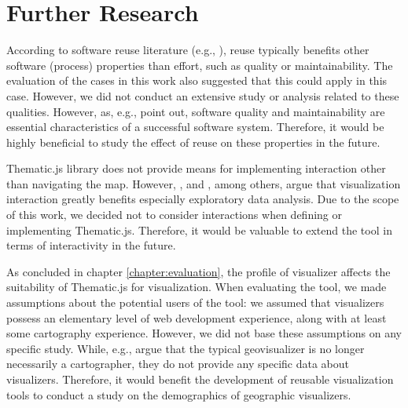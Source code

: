 \section{Further Research}

According to software reuse literature (e.g., \citealt{mohagheghi_quality_2007,frakes_success_1994}), reuse typically benefits other software (process) properties than effort, such as quality or maintainability. The evaluation of the cases in this work also suggested that this could apply in this case. However, we did not conduct an extensive study or analysis related to these qualities. However, as, e.g., \citet{kitchenham_software_1996} point out, software quality and maintainability are essential characteristics of a successful software system. Therefore, it would be highly beneficial to study the effect of reuse on these properties in the future.

Thematic.js library does not provide means for implementing interaction other than navigating the map. However, \citet{andrienko_interactive_1999}, and \citet[chap.~21]{slocum_thematic_2014}, among others, argue that visualization interaction greatly benefits especially exploratory data analysis. Due to the scope of this work, we decided not to consider interactions when defining or implementing Thematic.js. Therefore, it would be valuable to extend the tool in terms of interactivity in the future.

As concluded in chapter \ref{chapter:evaluation}, the profile of visualizer affects the suitability of Thematic.js for visualization. When evaluating the tool, we made assumptions about the potential users of the tool: we assumed that visualizers possess an elementary level of web development experience, along with at least some cartography experience. However, we did not base these assumptions on any specific study. While, e.g., \citet{slocum_thematic_2014} argue that the typical geovisualizer is no longer necessarily a cartographer, they do not provide any specific data about visualizers. Therefore, it would benefit the development of reusable visualization tools to conduct a study on the demographics of geographic visualizers. 

